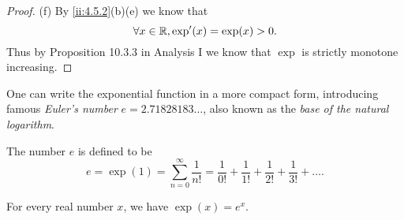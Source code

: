 \begin{proof}{(f)}
  By \cref{ii:4.5.2}(b)(e) we know that
  \[
    \forall x \in \mathbb{R}, \exp'(x) = \exp(x) > 0.
  \]
  Thus by Proposition 10.3.3 in Analysis I we know that \(\exp\) is strictly monotone increasing.
\end{proof}

\begin{note}
  One can write the exponential function in a more compact form, introducing famous \emph{Euler's number} \(e = 2.71828183 \dots\), also known as the \emph{base of the natural logarithm}.
\end{note}

\begin{defn}\label{ii:4.5.3}
  The number \(e\) is defined to be
  \[
    e = \exp(1) = \sum_{n = 0}^\infty \dfrac{1}{n!} = \dfrac{1}{0!} + \dfrac{1}{1!} + \dfrac{1}{2!} + \dfrac{1}{3!} + \dots.
  \]
\end{defn}

\begin{prop}\label{ii:4.5.4}
  For every real number \(x\), we have \(\exp(x) = e^x\).
\end{prop}

